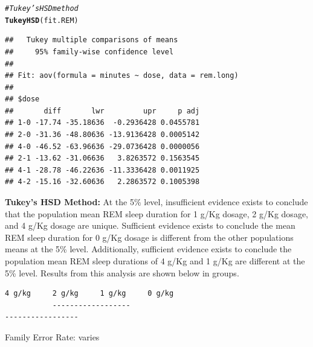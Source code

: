 \documentclass{article}\usepackage[]{graphicx}\usepackage[]{color}
\makeatletter
\newcommand{\hlcom}[1]{\textcolor[rgb]{0.678,0.584,0.686}{\textit{#1}}}%
\newcommand{\hlstd}[1]{\textcolor[rgb]{0.345,0.345,0.345}{#1}}%
\newcommand{\hlkwd}[1]{\textcolor[rgb]{0.737,0.353,0.396}{\textbf{#1}}}%
\newenvironment{kframe}{%
 \def\at@end@of@kframe{}%
 \ifinner\ifhmode%
  \def\at@end@of@kframe{\end{minipage}}%
  \begin{minipage}{\columnwidth}%
 \fi\fi%
 \def\FrameCommand##1{\hskip\@totalleftmargin \hskip-\fboxsep
 \colorbox{shadecolor}{##1}\hskip-\fboxsep
     \hskip-\linewidth \hskip-\@totalleftmargin \hskip\columnwidth}%
 \MakeFramed {\advance\hsize-\width
   \@totalleftmargin\z@ \linewidth\hsize
   \@setminipage}}%
 {\par\unskip\endMakeFramed%
 \at@end@of@kframe}
\newenvironment{knitrout}{}{} %
\makeatother
\begin{document}
\begin{knitrout}
\color{fgcolor}\begin{kframe}
\begin{alltt}
\hlcom{# Tukey's HSD method}
\hlkwd{TukeyHSD}\hlstd{(fit.REM)}
\end{alltt}
\begin{verbatim}
##   Tukey multiple comparisons of means
##     95% family-wise confidence level
## 
## Fit: aov(formula = minutes ~ dose, data = rem.long)
## 
## $dose
##       diff       lwr         upr     p adj
## 1-0 -17.74 -35.18636  -0.2936428 0.0455781
## 2-0 -31.36 -48.80636 -13.9136428 0.0005142
## 4-0 -46.52 -63.96636 -29.0736428 0.0000056
## 2-1 -13.62 -31.06636   3.8263572 0.1563545
## 4-1 -28.78 -46.22636 -11.3336428 0.0011925
## 4-2 -15.16 -32.60636   2.2863572 0.1005398
\end{verbatim}
\end{kframe}
\end{knitrout}
\textbf{Tukey's HSD Method:}  At the 5\% level, insufficient evidence exists to conclude that the population mean REM sleep duration for 1 g/Kg dosage, 2 g/Kg dosage, and 4 g/Kg dosage are unique.  Sufficient evidence exists to conclude the mean REM sleep duration for 0 g/Kg dosage is different from the other populations means at the 5\% level.  Additionally, sufficient evidence exists to conclude the population mean REM sleep durations of 4 g/Kg and 1 g/Kg are different at the 5\% level. Results from this analysis are shown below in groups.

\begin{verbatim}
4 g/kg     2 g/kg     1 g/kg     0 g/kg
           ------------------
-----------------
\end{verbatim}

Family Error Rate:  varies\\
\end{document}
